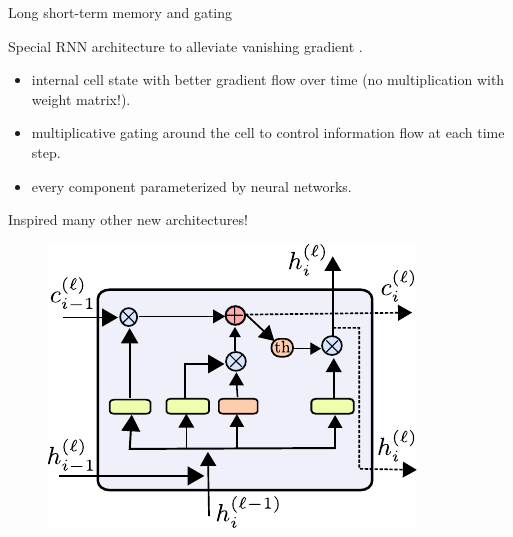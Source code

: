 \begin{frame}{Long short-term memory and gating}
\begin{minipage}{0.55\linewidth}
Special RNN architecture to alleviate vanishing gradient .
\begin{itemize}
\item internal cell state with better gradient flow over time (no multiplication with weight matrix!).
\item multiplicative gating around the cell to control information flow at each time step.
\item every component parameterized by neural networks.
\end{itemize}
Inspired many other new architectures!
\end{minipage}
\begin{minipage}{0.4\linewidth}
\begin{figure}
                        \centering
                        \includegraphics[width=.9\linewidth]{./figures/lstm.pdf}
\end{figure}
\end{minipage}
\end{frame}

